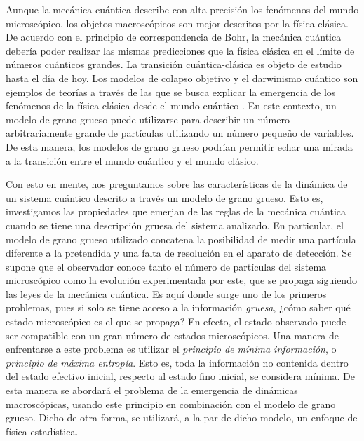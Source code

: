 Aunque la mecánica cuántica describe con alta precisión los fenómenos del mundo microscópico, los objetos macroscópicos son mejor descritos por la física clásica. De acuerdo con el principio de correspondencia de Bohr, la mecánica cuántica debería poder realizar las mismas predicciones que la física clásica en el límite de números cuánticos grandes. La transición cuántica-clásica es objeto de estudio hasta el día de hoy. Los modelos de colapso objetivo y el darwinismo cuántico son ejemplos de teorías a través de las que se busca explicar la emergencia de los fenómenos de la física clásica desde el mundo cuántico \cite{Zurek, Bassi}. En este contexto, un modelo de grano grueso puede utilizarse para describir un número arbitrariamente grande de partículas utilizando un número pequeño de variables. De esta manera, los modelos de grano grueso podrían permitir echar una mirada a la transición entre el mundo cuántico y el mundo clásico.



Con esto en mente, nos preguntamos sobre las características de la dinámica de un sistema cuántico descrito a través un modelo de grano grueso. Esto es, investigamos las propiedades que emerjan de las reglas de la mecánica cuántica cuando se tiene una descripción gruesa del sistema analizado. En particular, el modelo de grano grueso utilizado concatena la posibilidad de medir una partícula diferente a la pretendida y una falta de resolución en el aparato de detección. Se supone que el observador conoce tanto el número de partículas del sistema microscópico como la evolución experimentada por este, que se propaga siguiendo las leyes de la mecánica cuántica. Es aquí donde surge uno de los primeros problemas, pues si solo se tiene acceso a la información \textit{gruesa}, ¿cómo saber qué estado microscópico es el que se propaga? En efecto, el estado observado puede ser compatible con un gran número de estados microscópicos. Una manera de enfrentarse a este problema es utilizar el \textit{principio de mínima información}, o \textit{principio de máxima entropía}. Esto es, toda la información no contenida dentro del estado efectivo inicial, respecto al estado fino inicial, se considera mínima. De esta manera se abordará el problema de la emergencia de dinámicas macroscópicas, usando este principio \cite{JaynesI,Brillouin} en combinación con el modelo de grano grueso. Dicho de otra forma, se utilizará, a la par de dicho modelo, un enfoque de física estadística. %


